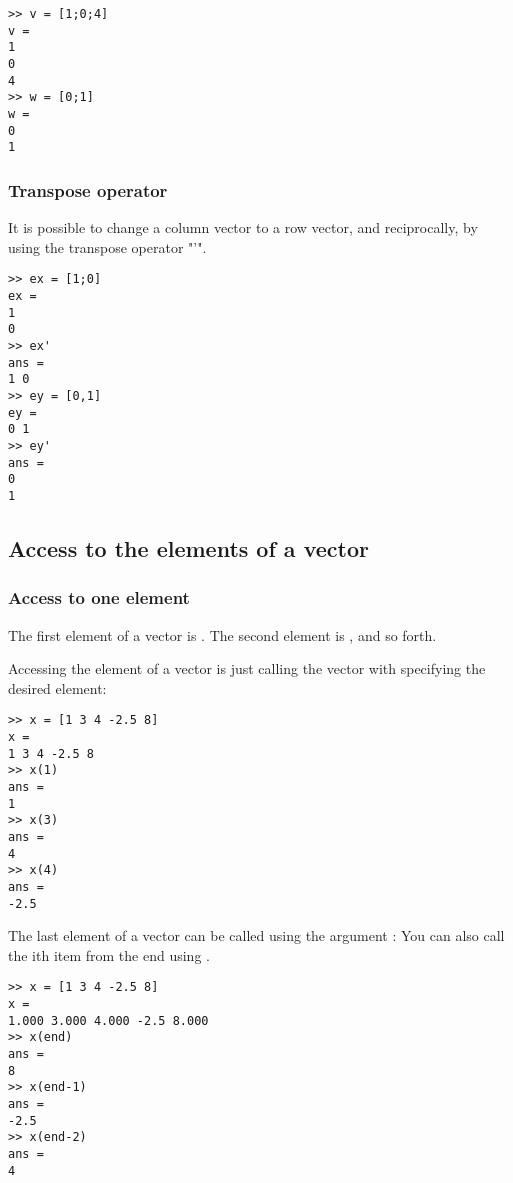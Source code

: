 \begin{lstlisting}
>> v = [1;0;4]
v =
1
0
4
>> w = [0;1]
w =
0
1
\end{lstlisting}

\subsubsection{Transpose operator}

It is possible to change a column vector to a row vector, and reciprocally, by using the transpose operator "'".
\begin{lstlisting}
>> ex = [1;0]
ex =
1
0
>> ex'
ans =
1 0
>> ey = [0,1]
ey =
0 1
>> ey'
ans =
0
1
\end{lstlisting}


\subsection{Access to the elements of a vector}

\subsubsection{Access to one element}

The first element of a vector  is .
The second element is , and so forth.

Accessing the element of a vector is just calling the vector with specifying the desired element:

\begin{lstlisting}
>> x = [1 3 4 -2.5 8]
x = 
1 3 4 -2.5 8
>> x(1)
ans = 
1
>> x(3)
ans = 
4
>> x(4)
ans = 
-2.5
\end{lstlisting}




The last element of a vector can be called using the argument :
You can also call the ith item from the end using . 
\begin{lstlisting}
>> x = [1 3 4 -2.5 8]
x = 
1.000 3.000 4.000 -2.5 8.000
>> x(end)
ans = 
8
>> x(end-1)
ans = 
-2.5
>> x(end-2)
ans = 
4
\end{lstlisting}



